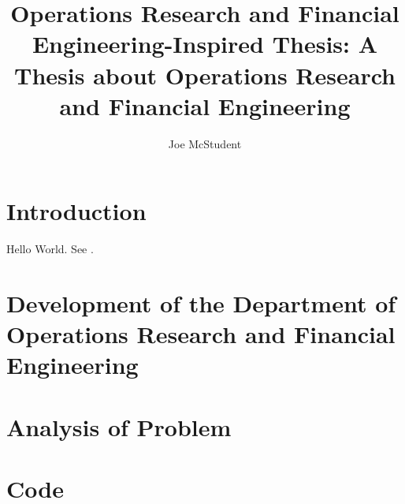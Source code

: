 \documentclass[12pt,lot,lof]{puthesis_undergraduate}
\title{Operations Research and Financial Engineering-Inspired Thesis: A Thesis
about Operations Research and Financial Engineering}
\author{Joe McStudent}
\begin{document}
\chapter{Introduction}\label{ch:intro}  %

Hello World. See \cite{A01}.


\chapter{Development of the Department of Operations Research and Financial Engineering}  %


\chapter{Analysis of Problem}


\appendix
\chapter{Code}




 \label{bib}
\end{document}

